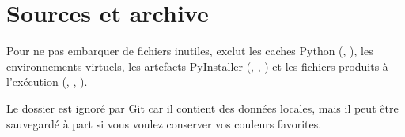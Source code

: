\section{Sources et archive}

Pour ne pas embarquer de fichiers inutiles,  exclut les
caches Python (, ), les environnements
virtuels, les artefacts PyInstaller (, , )
et les fichiers produits à l'exécution (,
, ).

\begin{note}
Le dossier  est ignoré par Git car il contient des données
locales, mais il peut être sauvegardé à part si vous voulez conserver vos
couleurs favorites.
\end{note}
